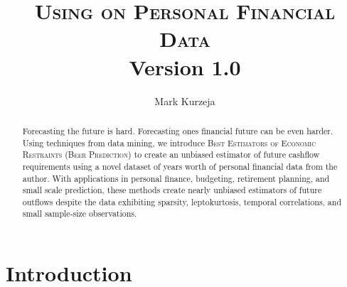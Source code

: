 \documentclass[11pt,a4paper]{article}
\title{\textsc{Using \beer on Personal Financial Data}  \\ {\small Version 1.0}}
\author{Mark Kurzeja}
\date{}
\newcommand{\beer}{\textsc{Beer Prediction}\xspace}
\begin{document}
\maketitle
\begin{abstract}



Forecasting the future is hard. Forecasting ones financial future can be even harder. Using techniques from data mining, we introduce \textsc{Best Estimators of Economic Restraints} (\beer) to create an unbiased estimator of future cashflow requirements using a novel dataset of years worth of personal financial data from the author. With applications in personal finance, budgeting, retirement planning, and small scale prediction, these methods create nearly unbiased estimators of future outflows despite the data exhibiting sparsity, leptokurtosis, temporal correlations, and small sample-size observations. 

  
\end{abstract}

\section{Introduction} \label{sec:introduction}
\end{document}
